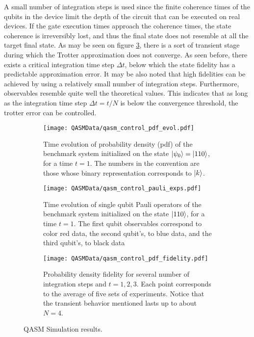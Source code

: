     A small number of integration steps is used since the finite coherence times of the qubits in the device limit the depth of the circuit that can be executed on real devices. If the gate execution times approach the coherence times, the state coherence is irreversibly lost, and thus the final state does not resemble at all the target final state. As may be seen on figure \ref{fig:QASMfidelity}, there is a sort of transient stage during which the Trotter approximation does not converge. As seen before, there exists a critical integration time step $\Delta t$, below which the state fidelity has a predictable approximation error. It may be also noted that high fidelities can be achieved by using a relatively small number of integration steps. Furthermore, observables resemble quite well the theoretical values. This indicates that as long as the integration time step $\Delta t = t / N$ is below the convergence threshold, the trotter error can be controlled.

    \begin{figure}
      \centering
      \begin{subfigure}[b]{1.0\textwidth}
        \centering
        \texttt{[image: QASMData/qasm\_control\_pdf\_evol.pdf]}
        \caption{Time evolution of probability density (pdf) of the benchmark system initialized on the state $\ket{\psi_0} = \ket{110}$, for a time $t=1$. The numbers in the convention are those whose binary representation corresponds to $\ket{k}$.}
        \label{fig:QASMpdf}
      \end{subfigure}
      \begin{subfigure}[b]{1.0\textwidth}
        \centering
        \texttt{[image: QASMData/qasm\_control\_pauli\_exps.pdf]}
        \caption{Time evolution of single qubit Pauli operators of the benchmark system initialized on the state $\ket{110}$, for a time $t=1$. The first qubit observables correspond to color red data, the second qubit's, to blue data, and the third qubit's, to black data}
        \label{fig:QASMpaulis}
      \end{subfigure}
      \begin{subfigure}[b]{1.0\textwidth}
        \centering
        \texttt{[image: QASMData/qasm\_control\_pdf\_fidelity.pdf]}
        \caption{Probability density fidelity for several number of integration steps and $t = 1, 2, 3$. Each point corresponds to the average of five sets of experiments. Notice that the transient behavior mentioned lasts up to about $N = 4$.}
        \label{fig:QASMfidelity}
      \end{subfigure}
      \caption{QASM Simulation results.}
      \label{fig:QASMResults}
    \end{figure}

